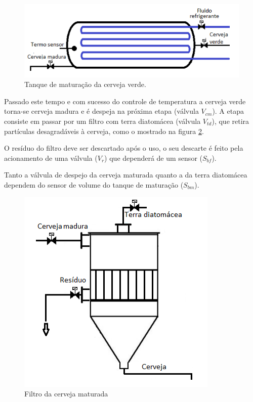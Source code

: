\documentclass[twoside,twocolumn, 12pt]{paper}
\begin{document}
	\begin{figure}
		\centering
		\includegraphics [width=\columnwidth]{tanque.png}
		\caption {Tanque de maturação da cerveja verde.}
		\label{fig:maturador}
	\end{figure}
	
	Passado este tempo e com sucesso do controle de temperatura a cerveja verde torna-se cerveja madura e é despeja na próxima etapa (válvula $V_{cm}$). A etapa consiste em passar por um filtro com terra diatomácea (válvula $V_{td}$), que retira partículas desagradáveis à cerveja, como o mostrado na figura \ref{fig:filtro}. 
	
	O resíduo do filtro deve ser descartado após o uso, o seu descarte é feito pela acionamento de uma válvula ($V_r$) que dependerá de um sensor ($S_{bf}$).
	
	
	Tanto a válvula de despejo da cerveja maturada quanto a da terra diatomácea dependem do sensor de volume do tanque de maturação ($S_{bm}$).
	
	\begin{figure}
		\centering
		\includegraphics [width=\columnwidth]{filtro.png}
		\caption {Filtro da cerveja maturada}
		\label{fig:filtro}
	\end{figure}
	
\end{document}
